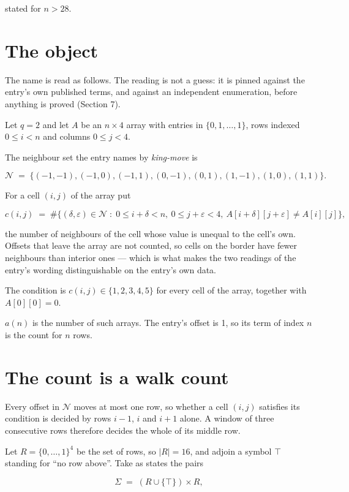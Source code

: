 \documentclass[11pt]{article}
\theoremstyle{definition}
\begin{document}
stated for $n > 28$.

\section{The object}

The name is read as follows. The reading is not a guess: it is pinned against the entry's own published terms, and against an independent enumeration, before anything is proved (Section 7).

Let $q = 2$ and let $A$ be an $n \times 4$ array with entries in $\{0,1,\dots,1\}$, rows indexed $0 \le i < n$ and columns $0 \le j < 4$.

The neighbour set the entry names by {\itshape king-move} is

\[\mathcal{N} \;=\; \{(-1,-1), (-1,0), (-1,1), (0,-1), (0,1), (1,-1), (1,0), (1,1)\}.\]

For a cell $(i,j)$ of the array put

\[c(i,j) \;=\; \#\bigl\{(\delta,\varepsilon)\in\mathcal{N} \;:\; 0\le i+\delta<n,\ 0\le j+\varepsilon<4,\ A[i+\delta][j+\varepsilon] \neq A[i][j]\bigr\},\]

the number of neighbours of the cell whose value is unequal to the cell's own. Offsets that leave the array are not counted, so cells on the border have fewer neighbours than interior ones --- which is what makes the two readings of the entry's wording distinguishable on the entry's own data.

The condition is $c(i,j) \in \{1, 2, 3, 4, 5\}$ for every cell of the array, together with $A[0][0]=0$.

$a(n)$ is the number of such arrays. The entry's offset is 1, so its term of index $n$ is the count for $n$ rows.

\section{The count is a walk count}

Every offset in $\mathcal{N}$ moves at most one row, so whether a cell $(i,j)$ satisfies its condition is decided by rows $i-1$, $i$ and $i+1$ alone. A window of three consecutive rows therefore decides the whole of its middle row.

Let $R = \{0,\dots,1\}^{4}$ be the set of rows, so $|R| = 16$, and adjoin a symbol $\top$ standing for ``no row above''. Take as states the pairs

\[\Sigma \;=\; (R \cup \{\top\}) \times R,\]
\end{document}
